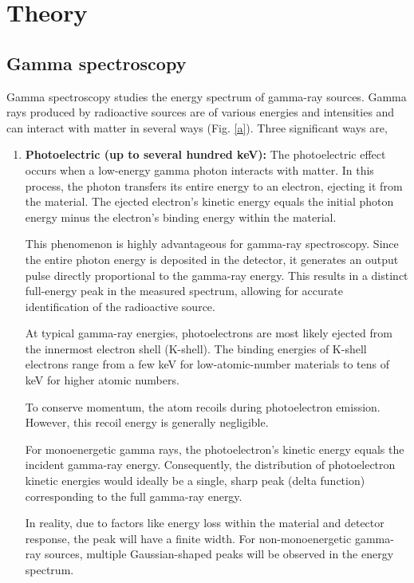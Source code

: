 \section{Theory}

\subsection{Gamma spectroscopy}
    Gamma spectroscopy studies the energy spectrum  of gamma-ray sources. Gamma rays produced by radioactive sources are of various energies and intensities and can interact with matter in several ways (Fig. \ref{a}). Three significant ways are,\\

    \begin{enumerate}
        \item \textbf{Photoelectric (up to several hundred keV):} The photoelectric effect occurs when a low-energy gamma photon interacts with matter. In this process, the photon transfers its entire energy to an electron, ejecting it from the material. The ejected electron's kinetic energy equals the initial photon energy minus the electron's binding energy within the material.

        This phenomenon is highly advantageous for gamma-ray spectroscopy. Since the entire photon energy is deposited in the detector, it generates an output pulse directly proportional to the gamma-ray energy. This results in a distinct full-energy peak in the measured spectrum, allowing for accurate identification of the radioactive source.

        At typical gamma-ray energies, photoelectrons are most likely ejected from the innermost electron shell (K-shell). The binding energies of K-shell electrons range from a few keV for low-atomic-number materials to tens of keV for higher atomic numbers.

        To conserve momentum, the atom recoils during photoelectron emission. However, this recoil energy is generally negligible.

        For monoenergetic gamma rays, the photoelectron's kinetic energy equals the incident gamma-ray energy. Consequently, the distribution of photoelectron kinetic energies would ideally be a single, sharp peak (delta function) corresponding to the full gamma-ray energy.

        In reality, due to factors like energy loss within the material and detector response, the peak will have a finite width. For non-monoenergetic gamma-ray sources, multiple Gaussian-shaped peaks will be observed in the energy spectrum.\\
    

\end{enumerate}
